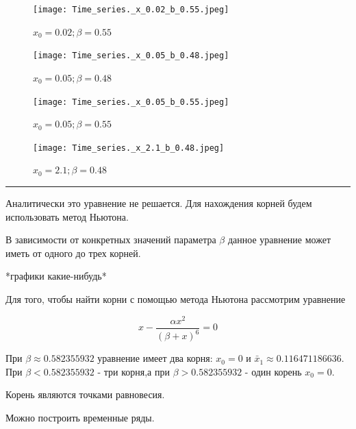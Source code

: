         \begin{figure}[h!]
            \centering
            \texttt{[image: Time\_series.\_x\_0.02\_b\_0.55.jpeg]}

            \captionsetup{justification=centering}
            \caption{\(x_0 = 0.02; \beta = 0.55\)}
            \label{timeSeriesX=0.02b=0.55}
        \end{figure}
    
        \begin{figure}[h!]
            \centering
            \texttt{[image: Time\_series.\_x\_0.05\_b\_0.48.jpeg]}

            \captionsetup{justification=centering}
            \caption{\(x_0 = 0.05; \beta = 0.48\)}
            \label{timeSeriesX=0.05b=0.48}
        \end{figure}
    
        \begin{figure}[h!]
            \centering
            \texttt{[image: Time\_series.\_x\_0.05\_b\_0.55.jpeg]}

            \captionsetup{justification=centering}
            \caption{\(x_0 = 0.05; \beta = 0.55\)}
            \label{timeSeriesX=0.05b=0.55}
        \end{figure}
    
        \begin{figure}[h!]
            \centering
            \texttt{[image: Time\_series.\_x\_2.1\_b\_0.48.jpeg]}

            \captionsetup{justification=centering}
            \caption{\(x_0 = 2.1; \beta = 0.48\)}
            \label{timeSeriesX=2.1b=0.48}
        \end{figure}

        \par\noindent\rule{\textwidth}{1pt}

        Аналитически это уравнение не решается. Для нахождения корней будем использовать метод Ньютона.

        В зависимости от конкретных значений параметра \(\beta\) данное уравнение может иметь от одного до трех корней.
    
        *графики какие-нибудь*

        Для того, чтобы найти корни с помощью метода Ньютона рассмотрим уравнение 
    
        \[x - \frac{\alpha x^2}{(\beta + x)^6} = 0\]

        При \(\beta \approx 0.582355932\) уравнение имеет два корня: \(x_0 = 0\) и \(\bar{x}_1 \approx 0.116471186636\). При \(\beta < 0.582355932\) - три корня,а при \(\beta > 0.582355932\) - один корень \(x_0 = 0\).
    
        Корень являются точками равновесия.

        Можно построить временные ряды.
